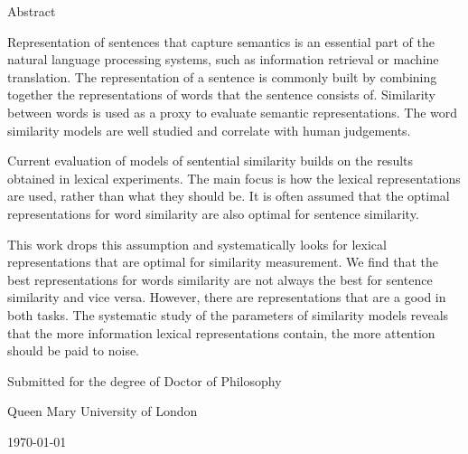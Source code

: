 {\Large \headingfont \thetitle}

\vspace{1em}

{\large \headingfont \theauthor}

\vspace{1em}

{\headingfont Abstract}

Representation of sentences that capture semantics is an essential part of the natural language processing systems, such as information retrieval or machine translation. The representation of a sentence is commonly built by combining together the representations of words that the sentence consists of. Similarity between words is used as a proxy to evaluate semantic representations. The word similarity models are well studied and correlate with human judgements.

Current evaluation of models of sentential similarity builds on the results obtained in lexical experiments. The main focus is how the lexical representations are used, rather than what they should be. It is often assumed that the optimal representations for word similarity are also optimal for sentence similarity.

This work drops this assumption and systematically looks for lexical representations that are optimal for similarity measurement. We find that the best representations for words similarity are not always the best for sentence similarity and vice versa. However, there are representations that are a good in both tasks. The systematic study of the parameters of similarity models reveals that the more information lexical representations contain, the more attention should be paid to noise.

\vfill


Submitted for the degree of Doctor of Philosophy

Queen Mary University of London

\today


